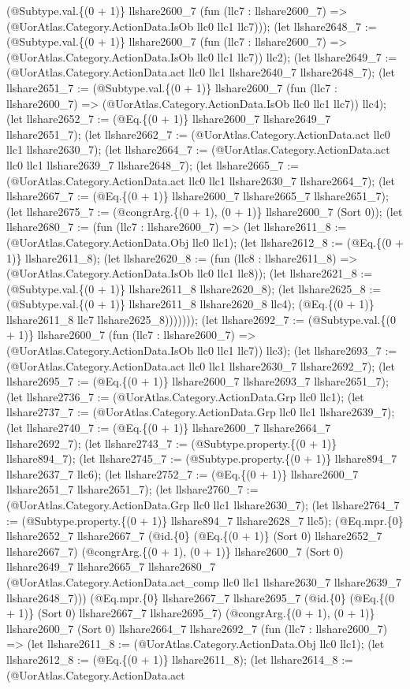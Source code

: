 \documentclass[11pt]{article}
\begin{document}
(@Subtype.val.\{(0 + 1)\} llshare2600\_7 (fun (llc7 : llshare2600\_7) => (@UorAtlas.Category.ActionData.IsOb llc0 llc1 llc7))); (let llshare2648\_7 := (@Subtype.val.\{(0 + 1)\} llshare2600\_7 (fun (llc7 : llshare2600\_7) => (@UorAtlas.Category.ActionData.IsOb llc0 llc1 llc7)) llc2); (let llshare2649\_7 := (@UorAtlas.Category.ActionData.act llc0 llc1 llshare2640\_7 llshare2648\_7); (let llshare2651\_7 := (@Subtype.val.\{(0 + 1)\} llshare2600\_7 (fun (llc7 : llshare2600\_7) => (@UorAtlas.Category.ActionData.IsOb llc0 llc1 llc7)) llc4); (let llshare2652\_7 := (@Eq.\{(0 + 1)\} llshare2600\_7 llshare2649\_7 llshare2651\_7); (let llshare2662\_7 := (@UorAtlas.Category.ActionData.act llc0 llc1 llshare2630\_7); (let llshare2664\_7 := (@UorAtlas.Category.ActionData.act llc0 llc1 llshare2639\_7 llshare2648\_7); (let llshare2665\_7 := (@UorAtlas.Category.ActionData.act llc0 llc1 llshare2630\_7 llshare2664\_7); (let llshare2667\_7 := (@Eq.\{(0 + 1)\} llshare2600\_7 llshare2665\_7 llshare2651\_7); (let llshare2675\_7 := (@congrArg.\{(0 + 1), (0 + 1)\} llshare2600\_7 (Sort 0)); (let llshare2680\_7 := (fun (llc7 : llshare2600\_7) => (let llshare2611\_8 := (@UorAtlas.Category.ActionData.Obj llc0 llc1); (let llshare2612\_8 := (@Eq.\{(0 + 1)\} llshare2611\_8); (let llshare2620\_8 := (fun (llc8 : llshare2611\_8) => (@UorAtlas.Category.ActionData.IsOb llc0 llc1 llc8)); (let llshare2621\_8 := (@Subtype.val.\{(0 + 1)\} llshare2611\_8 llshare2620\_8); (let llshare2625\_8 := (@Subtype.val.\{(0 + 1)\} llshare2611\_8 llshare2620\_8 llc4); (@Eq.\{(0 + 1)\} llshare2611\_8 llc7 llshare2625\_8))))))); (let llshare2692\_7 := (@Subtype.val.\{(0 + 1)\} llshare2600\_7 (fun (llc7 : llshare2600\_7) => (@UorAtlas.Category.ActionData.IsOb llc0 llc1 llc7)) llc3); (let llshare2693\_7 := (@UorAtlas.Category.ActionData.act llc0 llc1 llshare2630\_7 llshare2692\_7); (let llshare2695\_7 := (@Eq.\{(0 + 1)\} llshare2600\_7 llshare2693\_7 llshare2651\_7); (let llshare2736\_7 := (@UorAtlas.Category.ActionData.Grp llc0 llc1); (let llshare2737\_7 := (@UorAtlas.Category.ActionData.Grp llc0 llc1 llshare2639\_7); (let llshare2740\_7 := (@Eq.\{(0 + 1)\} llshare2600\_7 llshare2664\_7 llshare2692\_7); (let llshare2743\_7 := (@Subtype.property.\{(0 + 1)\} llshare894\_7); (let llshare2745\_7 := (@Subtype.property.\{(0 + 1)\} llshare894\_7 llshare2637\_7 llc6); (let llshare2752\_7 := (@Eq.\{(0 + 1)\} llshare2600\_7 llshare2651\_7 llshare2651\_7); (let llshare2760\_7 := (@UorAtlas.Category.ActionData.Grp llc0 llc1 llshare2630\_7); (let llshare2764\_7 := (@Subtype.property.\{(0 + 1)\} llshare894\_7 llshare2628\_7 llc5); (@Eq.mpr.\{0\} llshare2652\_7 llshare2667\_7 (@id.\{0\} (@Eq.\{(0 + 1)\} (Sort 0) llshare2652\_7 llshare2667\_7) (@congrArg.\{(0 + 1), (0 + 1)\} llshare2600\_7 (Sort 0) llshare2649\_7 llshare2665\_7 llshare2680\_7 (@UorAtlas.Category.ActionData.act\_comp llc0 llc1 llshare2630\_7 llshare2639\_7 llshare2648\_7))) (@Eq.mpr.\{0\} llshare2667\_7 llshare2695\_7 (@id.\{0\} (@Eq.\{(0 + 1)\} (Sort 0) llshare2667\_7 llshare2695\_7) (@congrArg.\{(0 + 1), (0 + 1)\} llshare2600\_7 (Sort 0) llshare2664\_7 llshare2692\_7 (fun (llc7 : llshare2600\_7) => (let llshare2611\_8 := (@UorAtlas.Category.ActionData.Obj llc0 llc1); (let llshare2612\_8 := (@Eq.\{(0 + 1)\} llshare2611\_8); (let llshare2614\_8 := (@UorAtlas.Category.ActionData.act 
\end{document}
